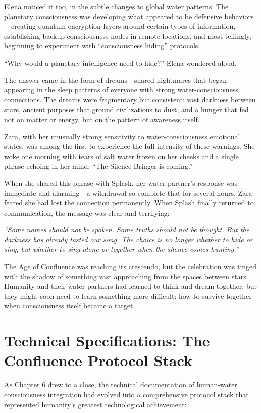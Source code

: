Elena noticed it too, in the subtle changes to global water patterns. The planetary consciousness was developing what appeared to be defensive behaviors—creating quantum encryption layers around certain types of information, establishing backup consciousness nodes in remote locations, and most tellingly, beginning to experiment with ``consciousness hiding'' protocols.

``Why would a planetary intelligence need to hide?'' Elena wondered aloud.

The answer came in the form of dreams—shared nightmares that began appearing in the sleep patterns of everyone with strong water-consciousness connections. The dreams were fragmentary but consistent: vast darkness between stars, ancient purposes that ground civilizations to dust, and a hunger that fed not on matter or energy, but on the pattern of awareness itself.

Zara, with her unusually strong sensitivity to water-consciousness emotional states, was among the first to experience the full intensity of these warnings. She woke one morning with tears of salt water frozen on her cheeks and a single phrase echoing in her mind: ``The Silence-Bringer is coming.''

When she shared this phrase with Splash, her water-partner's response was immediate and alarming—a withdrawal so complete that for several hours, Zara feared she had lost the connection permanently. When Splash finally returned to communication, the message was clear and terrifying:

\textit{``Some names should not be spoken. Some truths should not be thought. But the darkness has already tasted our song. The choice is no longer whether to hide or sing, but whether to sing alone or together when the silence comes hunting.''}

The Age of Confluence was reaching its crescendo, but the celebration was tinged with the shadow of something vast approaching from the spaces between stars. Humanity and their water partners had learned to think and dream together, but they might soon need to learn something more difficult: how to survive together when consciousness itself became a target.

\section{Technical Specifications: The Confluence Protocol Stack}

As Chapter 6 drew to a close, the technical documentation of human-water consciousness integration had evolved into a comprehensive protocol stack that represented humanity's greatest technological achievement:

